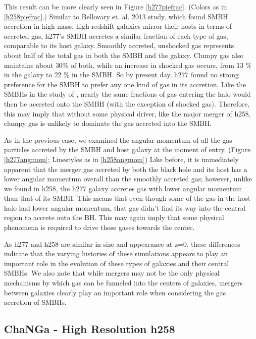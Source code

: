 \documentclass[manuscript]{aastex}
\begin{document}
This result can be more clearly seen in Figure \ref{h277piefrac}. (Colors as in \ref{h258piefrac}.) Similar to Bellovary et. al. 2013 study, which found SMBH accretion in high mass, high redshift galaxies mirror their hosts in terms of accreted gas, h277's SMBH accretes a similar fraction of each type of gas, comparable to its host galaxy. Smoothly accreted, unshocked gas represents about half of the total gas in both the SMBH and the galaxy. Clumpy gas also maintains about 30\% of both, while an increase in shocked gas occurs, from 13 \% in the galaxy to 22 \% in the SMBH. %
So by present day, h277 found no strong preference for the SMBH to prefer any one kind of gas in its accretion. Like the SMBHs in the study of \cite{Bellovary2013}, nearly the same fractions of gas entering the halo would then be accreted onto the SMBH (with the exception of shocked gas). Therefore, this may imply that without some physical driver, like the major merger of h258, clumpy gas is unlikely to dominate the gas accreted into the SMBH.

As in the previous case, we examined the angular momentum of all the gas particles accreted by the SMBH and host galaxy at the moment of entry. (Figure \ref{h277angmom}; Linestyles as in \ref{h258angmom}) Like before, it is immediately apparent that the merger gas accreted by both the black hole and its host has a lower angular momentum overall than the smoothly accreted gas; however, unlike we found in h258, the h277 galaxy accretes gas with lower angular momentum than that of its SMBH. This means that even though some of the gas in the host halo had lower angular momentum, that gas didn't find its way into the central region to accrete onto the BH. This may again imply that some physical phenomena is required to drive those gases towards the center. 

As h277 and h258 are similar in size and appearance at z=0, these differences indicate that the varying histories of these simulations appears to play an important role in the evolution of these types of galaxies and their central SMBHs. We also note that while mergers may not be the only physical mechanisms by which gas can be funneled into the centers of galaxies, mergers between galaxies clearly play an important role when considering the gas accretion of SMBHs.

\subsection{ChaNGa - High Resolution h258}
\end{document}
